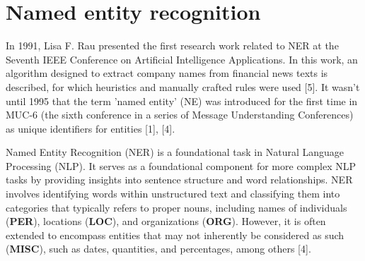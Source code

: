 




\section{Named entity recognition}

In 1991, Lisa F. Rau presented the first research work related to NER at the Seventh IEEE Conference on Artificial Intelligence Applications. In this work, an algorithm designed to extract company names from financial news texts is described, for which heuristics and manually crafted rules were used [5]. It wasn't until 1995 that the term 'named entity' (NE) was introduced for the first time in MUC-6 (the sixth conference in a series of Message Understanding Conferences) as unique identifiers for entities [1], [4].

Named Entity Recognition (NER) is a foundational task in Natural Language Processing (NLP).
It serves as a foundational component for more complex NLP tasks \cite{ma-etal-2022-label} by providing insights into sentence structure and word relationships. NER involves identifying words within unstructured text and classifying them into categories that typically refers to proper nouns, including names of individuals (\textbf{PER}), locations (\textbf{LOC}), and organizations (\textbf{ORG}). However, it is often extended to encompass entities that may not inherently be considered as such (\textbf{MISC})\cite{martin-2020-speech}, such as dates, quantities, and percentages, among others [4].

